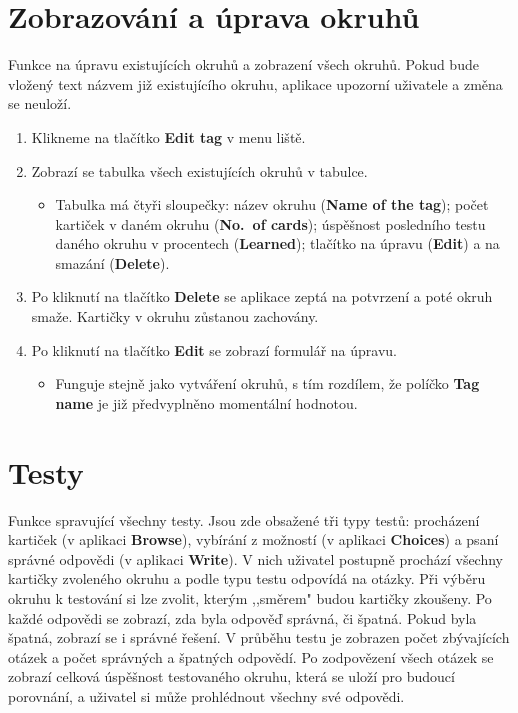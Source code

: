 \documentclass[12pt]{article}
\providecommand{\tightlist}{\setlength{\itemsep}{1pt}\setlength{\parskip}{1pt}}
\begin{document}
\hypertarget{zobrazovuxe1nuxed-a-uxfaprava-okruhux16f}{%
\section{Zobrazování a úprava
okruhů}\label{zobrazovuxe1nuxed-a-uxfaprava-okruhux16f}}

Funkce na úpravu existujících okruhů a zobrazení všech okruhů. Pokud
bude vložený text názvem již existujícího okruhu, aplikace upozorní
uživatele a změna se neuloží.

\begin{enumerate}
\def\labelenumi{\arabic{enumi}.}
\tightlist
\item
  Klikneme na tlačítko \textbf{Edit tag} v menu liště.
\item
  Zobrazí se tabulka všech existujících okruhů v tabulce.

  \begin{itemize}
  \tightlist
  \item
    Tabulka má čtyři sloupečky: název okruhu (\textbf{Name of the tag});
    počet kartiček v daném okruhu (\textbf{No.~of cards}); úspěšnost
    posledního testu daného okruhu v procentech (\textbf{Learned});
    tlačítko na úpravu (\textbf{Edit}) a na smazání (\textbf{Delete}).
  \end{itemize}
\item
  Po kliknutí na tlačítko \textbf{Delete} se aplikace zeptá na potvrzení
  a poté okruh smaže. Kartičky v okruhu zůstanou zachovány.
\item
  Po kliknutí na tlačítko \textbf{Edit} se zobrazí formulář na úpravu.

  \begin{itemize}
  \tightlist
  \item
    Funguje stejně jako vytváření okruhů, s tím rozdílem, že políčko
    \textbf{Tag name} je již předvyplněno momentální hodnotou.
  \end{itemize}
\end{enumerate}

\hypertarget{testy}{%
\section{Testy}\label{testy}}

Funkce spravující všechny testy. Jsou zde obsažené tři typy testů:
procházení kartiček (v aplikaci \textbf{Browse}), vybírání z možností (v
aplikaci \textbf{Choices}) a psaní správné odpovědi (v aplikaci
\textbf{Write}). V nich uživatel postupně prochází všechny kartičky
zvoleného okruhu a podle typu testu odpovídá na otázky. Při výběru
okruhu k testování si lze zvolit, kterým ,,směrem" budou kartičky
zkoušeny. Po každé odpovědi se zobrazí, zda byla odpověď správná, či
špatná. Pokud byla špatná, zobrazí se i správné řešení. V průběhu testu
je zobrazen počet zbývajících otázek a počet správných a špatných
odpovědí. Po zodpovězení všech otázek se zobrazí celková úspěšnost
testovaného okruhu, která se uloží pro budoucí porovnání, a uživatel si
může prohlédnout všechny své odpovědi.
\end{document}
